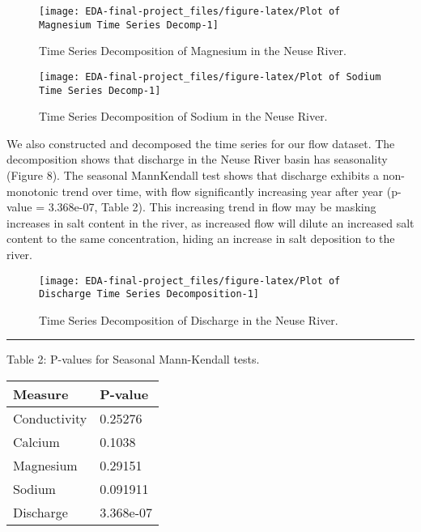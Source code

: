 \documentclass[
  12pt,
]{article}
\begin{document}
\begin{figure}

{\centering \texttt{[image: EDA-final-project\_files/figure-latex/Plot of Magnesium Time Series Decomp-1]} 

}

\caption{Time Series Decomposition of Magnesium in the Neuse River.}\label{fig:Plot of Magnesium Time Series Decomp}
\end{figure}

\begin{figure}

{\centering \texttt{[image: EDA-final-project\_files/figure-latex/Plot of Sodium Time Series Decomp-1]} 

}

\caption{Time Series Decomposition of Sodium in the Neuse River.}\label{fig:Plot of Sodium Time Series Decomp}
\end{figure}

\newpage

We also constructed and decomposed the time series for our flow dataset.
The decomposition shows that discharge in the Neuse River basin has
seasonality (Figure 8). The seasonal MannKendall test shows that
discharge exhibits a non-monotonic trend over time, with flow
significantly increasing year after year (p-value = 3.368e-07, Table 2).
This increasing trend in flow may be masking increases in salt content
in the river, as increased flow will dilute an increased salt content to
the same concentration, hiding an increase in salt deposition to the
river.

\begin{figure}

{\centering \texttt{[image: EDA-final-project\_files/figure-latex/Plot of Discharge Time Series Decomposition-1]} 

}

\caption{Time Series Decomposition of Discharge in the Neuse River.}\label{fig:Plot of Discharge Time Series Decomposition}
\end{figure}

\begin{center}\rule{0.5\linewidth}{0.5pt}\end{center}

Table 2: P-values for Seasonal Mann-Kendall tests.

\begin{longtable}[]{@{}ll@{}}
\toprule
Measure & P-value \\
\midrule
\endhead
Conductivity & 0.25276 \\
Calcium & 0.1038 \\
Magnesium & 0.29151 \\
Sodium & 0.091911 \\
Discharge & 3.368e-07 \\
\bottomrule
\end{longtable}
\end{document}
